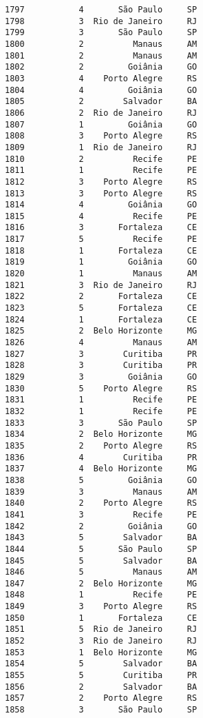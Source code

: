 \documentclass[11pt]{article}
\begin{document}
\begin{Verbatim}[commandchars=\\\{\}]
1797           4       São Paulo     SP  
1798           3  Rio de Janeiro     RJ  
1799           3       São Paulo     SP  
1800           2          Manaus     AM  
1801           2          Manaus     AM  
1802           2         Goiânia     GO  
1803           4    Porto Alegre     RS  
1804           4         Goiânia     GO  
1805           2        Salvador     BA  
1806           2  Rio de Janeiro     RJ  
1807           1         Goiânia     GO  
1808           3    Porto Alegre     RS  
1809           1  Rio de Janeiro     RJ  
1810           2          Recife     PE  
1811           1          Recife     PE  
1812           3    Porto Alegre     RS  
1813           3    Porto Alegre     RS  
1814           4         Goiânia     GO  
1815           4          Recife     PE  
1816           3       Fortaleza     CE  
1817           5          Recife     PE  
1818           1       Fortaleza     CE  
1819           1         Goiânia     GO  
1820           1          Manaus     AM  
1821           3  Rio de Janeiro     RJ  
1822           2       Fortaleza     CE  
1823           5       Fortaleza     CE  
1824           1       Fortaleza     CE  
1825           2  Belo Horizonte     MG  
1826           4          Manaus     AM  
1827           3        Curitiba     PR  
1828           3        Curitiba     PR  
1829           3         Goiânia     GO  
1830           5    Porto Alegre     RS  
1831           1          Recife     PE  
1832           1          Recife     PE  
1833           3       São Paulo     SP  
1834           2  Belo Horizonte     MG  
1835           2    Porto Alegre     RS  
1836           4        Curitiba     PR  
1837           4  Belo Horizonte     MG  
1838           5         Goiânia     GO  
1839           3          Manaus     AM  
1840           2    Porto Alegre     RS  
1841           3          Recife     PE  
1842           2         Goiânia     GO  
1843           5        Salvador     BA  
1844           5       São Paulo     SP  
1845           5        Salvador     BA  
1846           5          Manaus     AM  
1847           2  Belo Horizonte     MG  
1848           1          Recife     PE  
1849           3    Porto Alegre     RS  
1850           1       Fortaleza     CE  
1851           5  Rio de Janeiro     RJ  
1852           3  Rio de Janeiro     RJ  
1853           1  Belo Horizonte     MG  
1854           5        Salvador     BA  
1855           5        Curitiba     PR  
1856           2        Salvador     BA  
1857           2    Porto Alegre     RS  
1858           3       São Paulo     SP  

\end{Verbatim}
\end{document}
